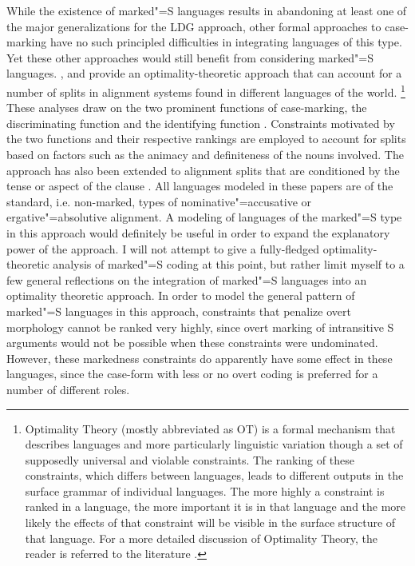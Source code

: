 While the existence of marked"=S languages results in abandoning at least one of the major generalizations for the LDG approach, other formal approaches to case-marking have no such principled difficulties in integrating languages of this type. 
Yet these other approaches would still benefit from considering marked"=S languages.
, \citet{Malchukov:2008} and \citet{Malchukov:2011} provide an optimality-theoretic approach that can account for a number of splits in alignment systems found in different languages of the world.
\footnote{Optimality Theory (mostly abbreviated as OT) is a formal mechanism that describes languages and more particularly linguistic variation though a set of supposedly universal and violable constraints. 
The ranking of these constraints, which differs between languages, leads to different outputs in the surface grammar of individual languages. 
The more highly a constraint is ranked in a language, the more important it is in that language and the more likely the effects of that constraint will be visible in the surface structure of that language. 
For a more detailed discussion of Optimality Theory, the reader is referred to the literature \citep{PrinceSmolensky:2004,Kager:1999,Legendre:2001}.} 
These analyses draw on the two prominent functions of case-marking, the discriminating function and the identifying function \citep[91--939]{Mallinson:1981}. 
 Constraints motivated by the two functions and their respective rankings are employed to account for splits based on factors such as the animacy and definiteness of the nouns involved. 
The approach has also been extended to alignment splits that are conditioned by the tense or aspect of the clause \citep{Malchukov:2011,Malchukov.tam}. 
All languages modeled in these papers are of the standard, i.e. non-marked, types of nominative"=accusative or ergative"=absolutive alignment. 
A modeling of languages of the marked"=S type in this approach would definitely be useful in order to expand the explanatory power of the approach.
I will not attempt to give a fully-fledged optimality-theoretic analysis of marked"=S coding at this point, but rather limit myself to a few general reflections on the integration of marked"=S languages into an optimality theoretic approach. 
In order to model the general pattern of marked"=S languages in this approach, constraints that penalize overt morphology cannot be ranked very highly, since overt marking of intransitive S arguments would not be possible when these constraints were undominated. 
However, these markedness constraints do apparently have some effect in these languages, since the case-form with less or no overt coding is preferred for a number of different roles.
